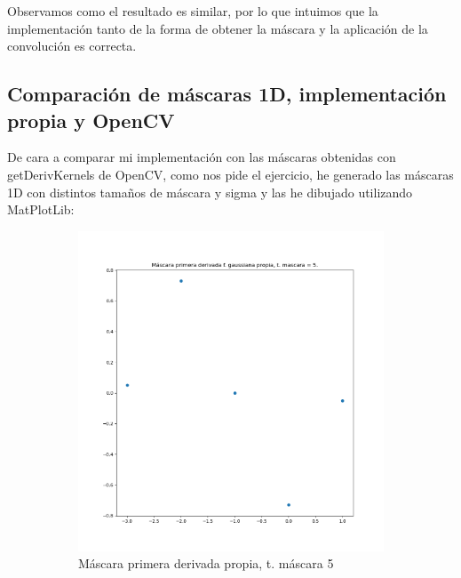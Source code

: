 \documentclass[12pt, spanish]{article}
\begin{document}
Observamos como el resultado es similar, por lo que intuimos que la implementación tanto de la forma de obtener la máscara y la aplicación de la convolución es correcta.

\subsection{Comparación de máscaras 1D, implementación propia y OpenCV}

De cara a comparar mi implementación con las máscaras obtenidas con getDerivKernels de OpenCV, como nos pide el ejercicio, he generado las máscaras 1D con distintos tamaños de máscara y sigma y las he dibujado utilizando MatPlotLib:


\begin{figure}[H]
  \centering
	\begin{subfigure}[t]{0.4\textwidth}
		\centering
		\includegraphics[width = \textwidth]{cmp-p5.png}
 		 \caption{Máscara primera derivada propia, t. máscara 5}
	\end{subfigure}
	\hspace{1cm}
	\begin{subfigure}[t]{0.4\textwidth}
		\centering

\end{subfigure}
\end{figure}
\end{document}
